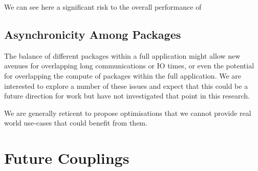 \documentclass[runningheads,a4paper]{llncs}
\begin{document}
We can see here a significant risk to the overall performance of 




\subsection{Asynchronicity Among Packages}

The balance of different packages within a full application might allow new avenues for overlapping long communications or IO times, or even the potential for overlapping the compute of packages within the full application. We are interested to explore a number of these issues and expect that this could be a future direction for work but have not investigated that point in this research.

We are generally reticent to propose optimisations that we cannot provide real world use-cases that could benefit from them. 

\section{Future Couplings}
\end{document}
